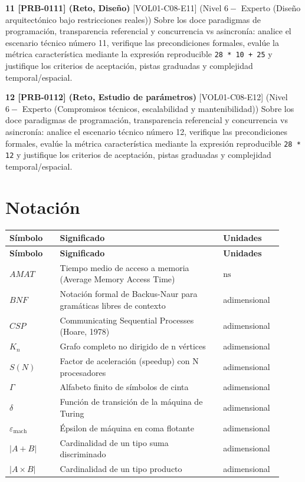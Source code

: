 \documentclass{book}
\begin{document}
\begin{tcolorbox}[title={Ejercicios}, studiumworked, breakable]
\noindent\textbf{11 [PRB-0111] (Reto, Diseño)}
[VOL01-C08-E11] (Nivel \(6 -\) Experto (Diseño arquitectónico bajo restricciones reales)) Sobre los doce paradigmas de programación, transparencia referencial y concurrencia vs asincronía: analice el escenario técnico número 11, verifique las precondiciones formales, evalúe la métrica característica mediante la expresión reproducible \texttt{28 * 10 + 25} y justifique los criterios de aceptación, pistas graduadas y complejidad temporal/espacial.

\noindent\textbf{12 [PRB-0112] (Reto, Estudio de parámetros)}
[VOL01-C08-E12] (Nivel \(6 -\) Experto (Compromisos técnicos, escalabilidad y mantenibilidad)) Sobre los doce paradigmas de programación, transparencia referencial y concurrencia vs asincronía: analice el escenario técnico número 12, verifique las precondiciones formales, evalúe la métrica característica mediante la expresión reproducible \texttt{28 * 12} y justifique los criterios de aceptación, pistas graduadas y complejidad temporal/espacial.
\end{tcolorbox}
\appendix
\chapter{Notación}

\begingroup
\setlength{\LTpre}{0pt}
\setlength{\LTpost}{0pt}
\begin{longtable}{@{}>{\centering\arraybackslash}p{0.17\linewidth}>{\raggedright\arraybackslash}p{0.55\linewidth}>{\raggedright\arraybackslash}p{0.2\linewidth}@{}}
\textbf{Símbolo} & \textbf{Significado} & \textbf{Unidades} \\
\hline
\endfirsthead
\textbf{Símbolo} & \textbf{Significado} & \textbf{Unidades} \\
\hline
\endhead
$AMAT$ & Tiempo medio de acceso a memoria (Average Memory Access Time) & $\mathrm{ns}$ \\
$BNF$ & Notación formal de Backus-Naur para gramáticas libres de contexto & adimensional \\
$CSP$ & Communicating Sequential Processes (Hoare, 1978) & adimensional \\
$K_{n}$ & Grafo completo no dirigido de n vértices & adimensional \\
$S(N)$ & Factor de aceleración (speedup) con N procesadores & adimensional \\
$\Gamma$ & Alfabeto finito de símbolos de cinta & adimensional \\
$\delta$ & Función de transición de la máquina de Turing & adimensional \\
$\varepsilon_{\mathrm{mach}}$ & Épsilon de máquina en coma flotante & adimensional \\
$|A + B|$ & Cardinalidad de un tipo suma discriminado & adimensional \\
$|A \times B|$ & Cardinalidad de un tipo producto & adimensional \\
\end{longtable}
\endgroup
\end{document}

